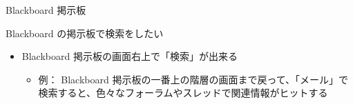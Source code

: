 \documentclass[a4j,10pt]{jsarticle}
\def\lthtmlcheckvsize{\ifdim\ht\sizebox<\vsize 
  \ifdim\wd\sizebox<\hsize\expandafter\hfill\fi \expandafter\vfill
  \else\expandafter\vss\fi}%
\begin{document}
{\newpage\clearpage
{}%
\begin{frame}[label={sec:org73e8e58},fragile]{Blackboard 掲示板}
\begin{block}{Blackboard の掲示板で検索をしたい}
\begin{itemize}
\item Blackboard 掲示板の画面右上で「検索」が出来る
\begin{itemize}
\item 例： Blackboard 掲示板の一番上の階層の画面まで戻って、「メール」で検索すると、色々なフォーラムやスレッドで関連情報がヒットする
\end{itemize}
\end{itemize}
\end{block}
\end{frame}%
\lthtmlfigureZ
\lthtmlcheckvsize\clearpage}
\end{document}

